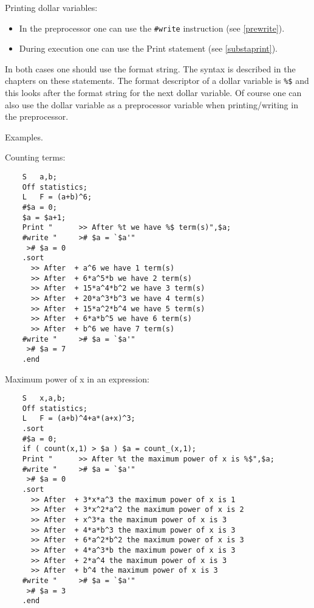 Printing dollar variables:
\begin{itemize}
\item In the preprocessor one can use the \verb:#write: instruction
        (see \ref{prewrite}).
\item During execution one can use the Print statement (see 
        \ref{substaprint}).
\end{itemize}
In both cases one should use the format string. The syntax is 
described in the chapters on these statements. The format descriptor of a 
dollar variable is \verb:%$: and this looks after the format string for the 
next dollar variable. Of course one can also use the dollar variable as a 
preprocessor variable when printing/writing in the preprocessor.

Examples.

Counting terms:
\begin{verbatim}
    S	a,b;
    Off statistics;
    L	F = (a+b)^6;
    #$a = 0;
    $a = $a+1;
    Print "      >> After %t we have %$ term(s)",$a;
    #write "     ># $a = `$a'"
     ># $a = 0
    .sort
      >> After  + a^6 we have 1 term(s)
      >> After  + 6*a^5*b we have 2 term(s)
      >> After  + 15*a^4*b^2 we have 3 term(s)
      >> After  + 20*a^3*b^3 we have 4 term(s)
      >> After  + 15*a^2*b^4 we have 5 term(s)
      >> After  + 6*a*b^5 we have 6 term(s)
      >> After  + b^6 we have 7 term(s)
    #write "     ># $a = `$a'"
     ># $a = 7
    .end
\end{verbatim}

\noindent Maximum power of x in an expression:
\begin{verbatim}
    S	x,a,b;
    Off statistics;
    L	F = (a+b)^4+a*(a+x)^3;
    .sort
    #$a = 0;
    if ( count(x,1) > $a ) $a = count_(x,1);
    Print "      >> After %t the maximum power of x is %$",$a;
    #write "     ># $a = `$a'"
     ># $a = 0
    .sort
      >> After  + 3*x*a^3 the maximum power of x is 1
      >> After  + 3*x^2*a^2 the maximum power of x is 2
      >> After  + x^3*a the maximum power of x is 3
      >> After  + 4*a*b^3 the maximum power of x is 3
      >> After  + 6*a^2*b^2 the maximum power of x is 3
      >> After  + 4*a^3*b the maximum power of x is 3
      >> After  + 2*a^4 the maximum power of x is 3
      >> After  + b^4 the maximum power of x is 3
    #write "     ># $a = `$a'"
     ># $a = 3
    .end
\end{verbatim}

